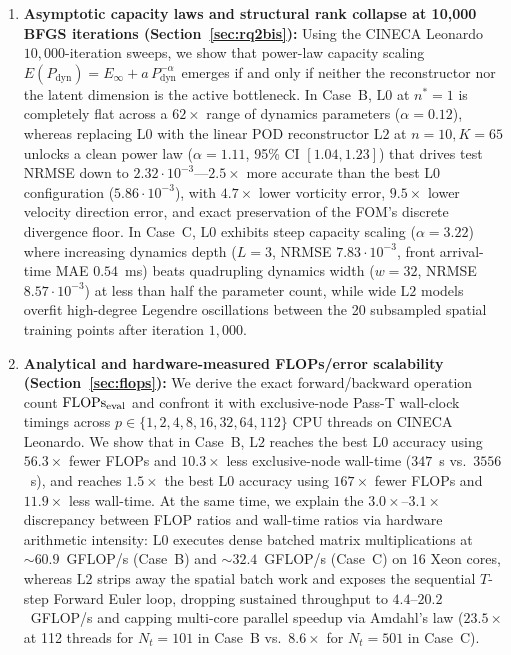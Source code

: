 \begin{enumerate}[leftmargin=2em]
  \item \textbf{Asymptotic capacity laws and structural rank collapse at 10,000 BFGS iterations (Section~\ref{sec:rq2bis}):} Using the CINECA Leonardo $10{,}000$-iteration sweeps, we show that power-law capacity scaling $E(P_{\mathrm{dyn}}) = E_\infty + a\,P_{\mathrm{dyn}}^{-\alpha}$ emerges if and only if neither the reconstructor nor the latent dimension is the active bottleneck. In Case~B, $\mathrm{L0}$ at $n^*=1$ is completely flat across a $62\times$ range of dynamics parameters ($\alpha = 0.12$), whereas replacing $\mathrm{L0}$ with the linear POD reconstructor $\mathrm{L2}$ at $n=10, K=65$ unlocks a clean power law ($\alpha = 1.11$, 95\% CI $[1.04, 1.23]$) that drives test NRMSE down to $2.32\cdot 10^{-3}$---$2.5\times$ more accurate than the best $\mathrm{L0}$ configuration ($5.86\cdot 10^{-3}$), with $4.7\times$ lower vorticity error, $9.5\times$ lower velocity direction error, and exact preservation of the FOM's discrete divergence floor. In Case~C, $\mathrm{L0}$ exhibits steep capacity scaling ($\alpha = 3.22$) where increasing dynamics depth ($L=3$, NRMSE $7.83\cdot 10^{-3}$, front arrival-time MAE $0.54$~ms) beats quadrupling dynamics width ($w=32$, NRMSE $8.57\cdot 10^{-3}$) at less than half the parameter count, while wide $\mathrm{L2}$ models overfit high-degree Legendre oscillations between the 20 subsampled spatial training points after iteration $1{,}000$.
  \item \textbf{Analytical and hardware-measured FLOPs/error scalability (Section~\ref{sec:flops}):} We derive the exact forward/backward operation count $\mathrm{FLOPs}_{\mathrm{eval}}$ and confront it with exclusive-node Pass-T wall-clock timings across $p \in \{1,2,4,8,16,32,64,112\}$ CPU threads on CINECA Leonardo. We show that in Case~B, $\mathrm{L2}$ reaches the best $\mathrm{L0}$ accuracy using $56.3\times$ fewer FLOPs and $10.3\times$ less exclusive-node wall-time ($347$~s vs.\ $3556$~s), and reaches $1.5\times$ the best $\mathrm{L0}$ accuracy using $167\times$ fewer FLOPs and $11.9\times$ less wall-time. At the same time, we explain the $3.0\times$--$3.1\times$ discrepancy between FLOP ratios and wall-time ratios via hardware arithmetic intensity: $\mathrm{L0}$ executes dense batched matrix multiplications at $\sim 60.9$~GFLOP/s (Case~B) and $\sim 32.4$~GFLOP/s (Case~C) on 16 Xeon cores, whereas $\mathrm{L2}$ strips away the spatial batch work and exposes the sequential $T$-step Forward Euler loop, dropping sustained throughput to $4.4$--$20.2$~GFLOP/s and capping multi-core parallel speedup via Amdahl's law ($23.5\times$ at 112 threads for $N_t=101$ in Case~B vs.\ $8.6\times$ for $N_t=501$ in Case~C).

\end{enumerate}
